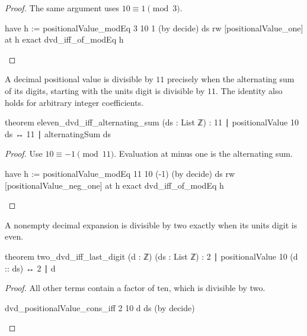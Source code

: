 \begin{proof}
  The same argument uses $10\equiv1\pmod3$.

  \begin{lean}
    have h := positionalValue_modEq 3 10 1 (by decide) ds
    rw [positionalValue_one] at h
    exact dvd_iff_of_modEq h
  \end{lean}
\end{proof}

\begin{theorem}
  \label{ent:thm:eleven-dvd-iff-alternating-sum}
  A decimal positional value is divisible by $11$ precisely when the alternating sum of its
  digits, starting with the units digit is divisible by $11$.
  The identity also holds for arbitrary integer coefficients.

  \begin{lean}
    theorem eleven_dvd_iff_alternating_sum (ds : List ℤ) :
        11 ∣ positionalValue 10 ds ↔ 11 ∣ alternatingSum ds
  \end{lean}
\end{theorem}

\begin{proof}
  Use $10\equiv-1\pmod{11}$.
  Evaluation at minus one is the alternating sum.

  \begin{lean}
    have h := positionalValue_modEq 11 10 (-1) (by decide) ds
    rw [positionalValue_neg_one] at h
    exact dvd_iff_of_modEq h
  \end{lean}
\end{proof}

\begin{theorem}
  \label{ent:thm:two-dvd-iff-last-digit}
  A nonempty decimal expansion is divisible by two exactly when its units digit is even.

  \begin{lean}
    theorem two_dvd_iff_last_digit (d : ℤ) (ds : List ℤ) :
        2 ∣ positionalValue 10 (d :: ds) ↔ 2 ∣ d
  \end{lean}
\end{theorem}

\begin{proof}
  All other terms contain a factor of ten, which is divisible by two.

  \begin{lean}
    dvd_positionalValue_cons_iff 2 10 d ds (by decide)
  \end{lean}
\end{proof}

